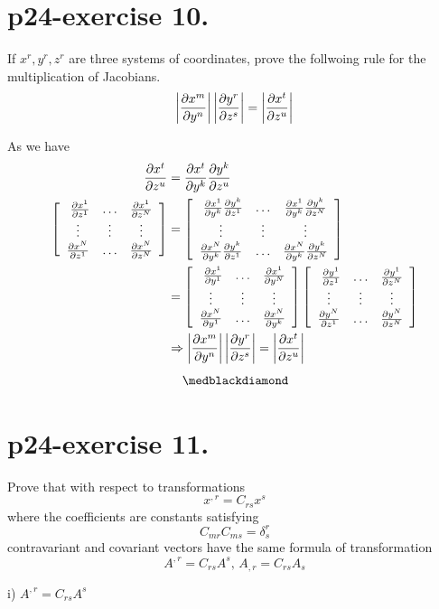 \section{p24-exercise 10.}
\begin{tcolorbox}
If $x^r, y^r, z^r$ are three systems of coordinates, prove the follwoing rule for the multiplication of Jacobians.
$$\left|\pdv{x^m}{y^n}\right|\left|\pdv{y^r}{z^s}\right| = \left|\pdv{x^t}{z^u}\right|$$
\end{tcolorbox}
 As we have  
\begin{align}
\pdv{x^t}{z^u} &=\pdv{x^t}{y^k} \pdv{y^k}{z^u}\\
 \left[ { \begin{array}{ccc}
   \ \pdv{x^1}{z^1} & \dots & \pdv{x^1}{z^N}\\
   \vdots & \vdots & \vdots\\
    \pdv{x^N}{z^1} & \dots & \pdv{x^N}{z^N}\\
  \end{array}} \right] &= \left[ { \begin{array}{ccc}
   \ \pdv{x^1}{y^k}\pdv{y^k}{z^1} & \dots & \pdv{x^1}{y^k}\pdv{y^k}{z^N}\\
   \vdots & \vdots & \vdots\\
    \pdv{x^N}{y^k}\pdv{y^k}{z^1}& \dots & \pdv{x^N}{y^k}\pdv{y^k}{z^N}\\
  \end{array}} \right]\\
  &= \left[ { \begin{array}{ccc}
   \ \pdv{x^1}{y^1}& \dots & \pdv{x^1}{y^N}\\
   \vdots & \vdots & \vdots\\
    \pdv{x^N}{y^1}& \dots & \pdv{x^N}{y^k}\\
  \end{array}} \right]\left[ { \begin{array}{ccc}
   \ \pdv{y^1}{z^1} & \dots & \pdv{y^1}{z^N}\\
   \vdots & \vdots & \vdots\\
    \pdv{y^N}{z^1}& \dots & \pdv{y^N}{z^N}\\
  \end{array}} \right]\\
  \ & \Rightarrow \left|\pdv{x^m}{y^n}\right|\left|\pdv{y^r}{z^s}\right| = \left|\pdv{x^t}{z^u}\right|
  \end{align}
$$\medblackdiamond$$
\pagebreak[4]


\section{p24-exercise 11.}
\begin{tcolorbox}
Prove that with respect to transformations $$ x^{,r} = C_{rs}x^s$$ where the coefficients are constants satisfying $$C_{mr}C_{ms} = \delta^r_s$$ contravariant and covariant vectors have the same formula of transformation $$ A^{,r} = C_{rs}A^{s} \text{, } A_{,r} = C_{rs}A_{s} $$
\end{tcolorbox}
 i) $ A^{,r} = C_{rs}A^{s}$\\
 
